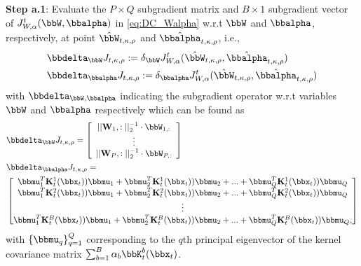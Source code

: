 \documentclass[10pt,final]{IEEEtran}
\begin{document}
\textbf{Step a.1}: Evaluate the $P\times Q$ subgradient  matrix and $B\times 1$ subgradient vector of $J_{W,\alpha}^t(\bbW,\bbalpha)$ in \eqref{eq:DC_Walpha} w.r.t $\bbW$ and $\bbalpha$, respectively, at point $\hat{\bbW}_{t,\kappa,\rho}$ and $\hat{\bbalpha}_{t,\kappa,\rho}$, i.e.,
\begin{align}\label{eq:Subgradient_Walpha}
&\bbdelta_{\bbW} J_{t,\kappa,\rho}:=\delta_{\bbW} J_{W,\alpha}^t(\hat{\bbW}_{t,\kappa,\rho},\hat{\bbalpha}_{t,\kappa,\rho}) \\
&\bbdelta_{\bbalpha} J_{t,\kappa,\rho}:=\delta_{\bbalpha} J_{W,\alpha}^t(\hat{\bbW}_{t,\kappa,\rho},\hat{\bbalpha}_{t,\kappa,\rho}) 
\end{align}
with $\bbdelta_{\bbW,\bbalpha}$ indicating the subgradient operator w.r.t variables $\bbW$ and $\bbalpha$ respectively which can be found as \cite{subgradient methods} 
\begin{align}\label{eq:DCA_Subgrads}
&\bbdelta_{\bbW}J_{t,\kappa,\rho}=\left[\begin{array}{c}{{||\mathbf{W}_{1},:||_2^{-1}}\cdot\bbW_{1,:}}\\
\vdots\\
{||\mathbf{W}_{P},:||_2^{-1}}\cdot\bbW_{P,:}
\end{array}\right]\\
&\bbdelta_{\bbalpha} J_{t,\kappa,\rho}=\nonumber\\
&\begin{bmatrix}
{\bbmu}_1^T\mathbf{K}_{t}^1(\bbx_{t})){\bbmu}_1+{\bbmu}_2^T\mathbf{K}_{t}^1(\bbx_{t})){\bbmu}_2+...+{\bbmu}_{Q}^T\mathbf{K}_{t}^1(\bbx_{t})){\bbmu}_{Q}\\
{\bbmu}_1^T\mathbf{K}_{t}^2(\bbx_{t})){\bbmu}_1+{\bbmu}_2^T\mathbf{K}_{t}^2(\bbx_{t})){\bbmu}_2+...+{\bbmu}_{Q}^T\mathbf{K}_{t}^2(\bbx_{t})){\bbmu}_{Q}\\
\vdots\\
{\bbmu}_1^T\mathbf{K}_{t}^B(\bbx_{t})){\bbmu}_1+{\bbmu}_2^T\mathbf{K}_{t}^B(\bbx_{t})){\bbmu}_2+...+{\bbmu}_{Q}^T\mathbf{K}_{t}^B(\bbx_{t})){\bbmu}_{Q}\nonumber,
\end{bmatrix}\nonumber
\end{align}
with $\{\bbmu_q\}_{q=1}^{Q}$ corresponding to the $q$th principal eigenvector of the kernel covariance matrix $\sum_{b=1}^B\alpha_b{\bbK}_{t}^b(\bbx_{t})$.
\end{document}
